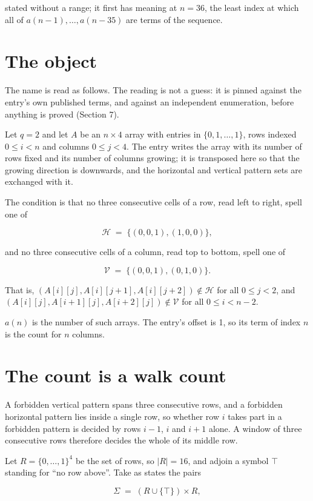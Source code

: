 \documentclass[11pt]{article}
\theoremstyle{definition}
\begin{document}
stated without a range; it first has meaning at $n = 36$, the least index at which all of $a(n-1),\dots,a(n-35)$ are terms of the sequence.

\section{The object}

The name is read as follows. The reading is not a guess: it is pinned against the entry's own published terms, and against an independent enumeration, before anything is proved (Section 7).

Let $q = 2$ and let $A$ be an $n \times 4$ array with entries in $\{0,1,\dots,1\}$, rows indexed $0 \le i < n$ and columns $0 \le j < 4$. The entry writes the array with its number of rows fixed and its number of columns growing; it is transposed here so that the growing direction is downwards, and the horizontal and vertical pattern sets are exchanged with it.

The condition is that no three consecutive cells of a row, read left to right, spell one of

\[\mathcal{H} \;=\; \{(0,0,1), (1,0,0)\},\]

and no three consecutive cells of a column, read top to bottom, spell one of

\[\mathcal{V} \;=\; \{(0,0,1), (0,1,0)\}.\]

That is, $(A[i][j],A[i][j{+}1],A[i][j{+}2]) \notin \mathcal{H}$ for all $0 \le j < 2$, and $(A[i][j],A[i{+}1][j],A[i{+}2][j]) \notin \mathcal{V}$ for all $0 \le i < n-2$.

$a(n)$ is the number of such arrays. The entry's offset is 1, so its term of index $n$ is the count for $n$ columns.

\section{The count is a walk count}

A forbidden vertical pattern spans three consecutive rows, and a forbidden horizontal pattern lies inside a single row, so whether row $i$ takes part in a forbidden pattern is decided by rows $i-1$, $i$ and $i+1$ alone. A window of three consecutive rows therefore decides the whole of its middle row.

Let $R = \{0,\dots,1\}^{4}$ be the set of rows, so $|R| = 16$, and adjoin a symbol $\top$ standing for ``no row above''. Take as states the pairs

\[\Sigma \;=\; (R \cup \{\top\}) \times R,\]
\end{document}
